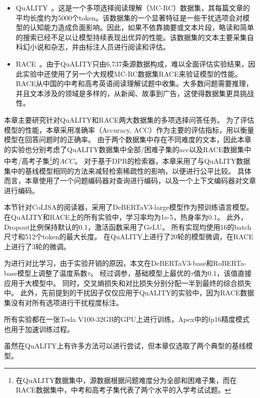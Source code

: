 \begin{itemize}
    \item QuALITY~\cite{pang2021quality}。这是一个多项选择阅读理解（MC-RC）数据集，其每篇文章的平均长度约为5000个token。该数据集的一个显著特征是一些干扰选项会对模型的认知能力造成负面影响。因此，如果不依靠摘要或文本片段，略读和简单的搜索已经不足以让模型持续表现出优异的性能。该数据集的文本主要采集自科幻小说和杂志，并由标注人员进行阅读和评估。
    \item RACE~\cite{lai2017race}。由于QuALITY只由6,737条源数据构成，难以全面评估实验结果，因此实验中还使用了另一个大规模MC-RC数据集RACE来验证模型的性能。RACE从中国的中考和高考英语阅读理解试题中收集。大多数问题需要推理，并且文本涉及的领域是多样的，从新闻、故事到广告，这使得数据集更具挑战性。
\end{itemize}

本章主要研究针对QuALITY\cite{pang2021quality}和RACE\cite{lai2017race}两大数据集的多项选择问答任务。
为了评估模型的性能，本章采用准确率（Accuracy, ACC）作为主要的评估指标，用以衡量模型在回答问题时的正确率。
由于两个数据集中存在不同难度的文本，因此本章的实验也分别考虑了QuALITY数据集中全部/困难子集的$acc$以及RACE数据集中中考/高考子集\footnote{在QuALITY数据集中，源数据根据问题难度分为全部和困难子集，而在RACE数据集中，中考和高考子集代表了两个水平的入学考试试题。}的$ACC$。
对于基于DPR的检索器，本章采用了与QuALITY数据集中的基线模型相同的方法来减轻检索稀疏性的影响，以便进行公平比较。
具体而言，本章使用了一个问题编码器对查询进行编码，以及一个上下文编码器对文章进行编码。

本节针对CoLISA的阅读器，采用了DeBERTaV3-large模型作为预训练语言模型。
在QuALITY和RACE上的所有实验中，学习率均为1e-5，热身率为0.1。
此外，Dropout比例保持默认的0.1，激活函数采用了GeLU\cite{hendrycks2016gaussian}。
所有实现均使用16的batch尺寸和512个token的最大长度。
在QuALITY上进行了20轮的模型微调，在RACE上进行了3轮的微调。

为进行对比学习，由于实验开销的原因，本文在DeBERTaV3-base和RoBERTa-base模型上调整了温度系数$\tau$。
经过调参，基础模型上最优的$\tau$值为0.1，该值直接应用于大模型中。
同时，交叉熵损失和对比损失分别分配一半到最终的综合损失中。
此外，先前提到的干扰因子仅仅应用于QuALITY的实验中，因为RACE数据集没有对所有选项进行干扰程度标注。

所有实验都在一张Tesla V100-32GB的GPU上进行训练，Apex中的fp16精度模式也用于加速训练过程。

虽然在QuALITY上有许多方法可以进行尝试，但本章仅选取了两个典型的基线模型。

